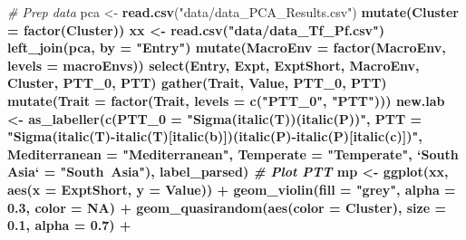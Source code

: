 \documentclass[
]{article}
\newenvironment{Shaded}{\begin{snugshade}}{\end{snugshade}}
\newcommand{\CommentTok}[1]{\textcolor[rgb]{0.56,0.35,0.01}{\textit{#1}}}
\newcommand{\DataTypeTok}[1]{\textcolor[rgb]{0.13,0.29,0.53}{#1}}
\newcommand{\DecValTok}[1]{\textcolor[rgb]{0.00,0.00,0.81}{#1}}
\newcommand{\FloatTok}[1]{\textcolor[rgb]{0.00,0.00,0.81}{#1}}
\newcommand{\KeywordTok}[1]{\textcolor[rgb]{0.13,0.29,0.53}{\textbf{#1}}}
\newcommand{\NormalTok}[1]{#1}
\newcommand{\OperatorTok}[1]{\textcolor[rgb]{0.81,0.36,0.00}{\textbf{#1}}}
\newcommand{\OtherTok}[1]{\textcolor[rgb]{0.56,0.35,0.01}{#1}}
\newcommand{\StringTok}[1]{\textcolor[rgb]{0.31,0.60,0.02}{#1}}
\begin{document}
\begin{Shaded}
\begin{Highlighting}[]
\CommentTok{# Prep data}
\NormalTok{pca <-}\StringTok{ }\KeywordTok{read.csv}\NormalTok{(}\StringTok{"data/data_PCA_Results.csv"}\NormalTok{) }\OperatorTok{%
\StringTok{  }\KeywordTok{mutate}\NormalTok{(}\DataTypeTok{Cluster =} \KeywordTok{factor}\NormalTok{(Cluster))}
\NormalTok{xx <-}\StringTok{ }\KeywordTok{read.csv}\NormalTok{(}\StringTok{"data/data_Tf_Pf.csv"}\NormalTok{) }\OperatorTok{%
\StringTok{  }\KeywordTok{left_join}\NormalTok{(pca, }\DataTypeTok{by =} \StringTok{"Entry"}\NormalTok{) }\OperatorTok{%
\StringTok{  }\KeywordTok{mutate}\NormalTok{(}\DataTypeTok{MacroEnv =} \KeywordTok{factor}\NormalTok{(MacroEnv, }\DataTypeTok{levels =}\NormalTok{ macroEnvs)) }\OperatorTok{%
\StringTok{  }\KeywordTok{select}\NormalTok{(Entry, Expt, ExptShort, MacroEnv, Cluster, PTT_}\DecValTok{0}\NormalTok{, PTT) }\OperatorTok{%
\StringTok{  }\KeywordTok{gather}\NormalTok{(Trait, Value, PTT_}\DecValTok{0}\NormalTok{, PTT) }\OperatorTok{%
\StringTok{  }\KeywordTok{mutate}\NormalTok{(}\DataTypeTok{Trait =} \KeywordTok{factor}\NormalTok{(Trait, }\DataTypeTok{levels =} \KeywordTok{c}\NormalTok{(}\StringTok{"PTT_0"}\NormalTok{, }\StringTok{"PTT"}\NormalTok{)))}
\NormalTok{new.lab <-}\StringTok{ }\KeywordTok{as_labeller}\NormalTok{(}\KeywordTok{c}\NormalTok{(}\DataTypeTok{PTT_0 =} \StringTok{"Sigma(italic(T))(italic(P))"}\NormalTok{,}
  \DataTypeTok{PTT =} \StringTok{"Sigma(italic(T)-italic(T)[italic(b)])(italic(P)-italic(P)[italic(c)])"}\NormalTok{, }
  \DataTypeTok{Mediterranean =} \StringTok{"Mediterranean"}\NormalTok{, }\DataTypeTok{Temperate =} \StringTok{"Temperate"}\NormalTok{, }
  \StringTok{`}\DataTypeTok{South Asia}\StringTok{`}\NormalTok{ =}\StringTok{ "South~Asia"}\NormalTok{), label_parsed)}
\CommentTok{# Plot PTT}
\NormalTok{mp <-}\StringTok{ }\KeywordTok{ggplot}\NormalTok{(xx, }\KeywordTok{aes}\NormalTok{(}\DataTypeTok{x =}\NormalTok{ ExptShort, }\DataTypeTok{y =}\NormalTok{ Value)) }\OperatorTok{+}
\StringTok{  }\KeywordTok{geom_violin}\NormalTok{(}\DataTypeTok{fill =} \StringTok{"grey"}\NormalTok{, }\DataTypeTok{alpha =} \FloatTok{0.3}\NormalTok{, }\DataTypeTok{color =} \OtherTok{NA}\NormalTok{) }\OperatorTok{+}\StringTok{ }
\StringTok{  }\KeywordTok{geom_quasirandom}\NormalTok{(}\KeywordTok{aes}\NormalTok{(}\DataTypeTok{color =}\NormalTok{ Cluster), }\DataTypeTok{size =} \FloatTok{0.1}\NormalTok{, }\DataTypeTok{alpha =} \FloatTok{0.7}\NormalTok{) }\OperatorTok{+}\StringTok{ }
}}}}}}
\end{Highlighting}
\end{Shaded}
\end{document}
